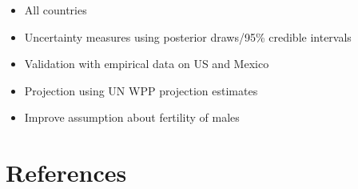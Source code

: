 \documentclass[
  11pt,
  letterpaper,
]{article}
\begin{document}
\begin{itemize}
\item
  All countries
\item
  Uncertainty measures using posterior draws/95\% credible intervals
\item
  Validation with empirical data on US and Mexico
\item
  Projection using UN WPP projection estimates
\item
  Improve assumption about fertility of males
\end{itemize}

\newpage

\hypertarget{references}{%
\section*{References}\label{references}}
\end{document}
